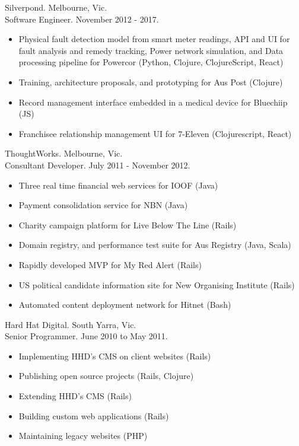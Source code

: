 \documentclass[margin]{res}
\begin{document}
\begin{resume}
  Silverpond. Melbourne, Vic. \\
  Software Engineer.  November 2012 - 2017.
  \begin{itemize}
  \item Physical fault detection model from smart meter readings, API and UI for
    fault analysis and remedy tracking, Power network simulation, and Data
    processing pipeline for Powercor (Python, Clojure, ClojureScript, React)
  \item Training, architecture proposals, and prototyping for Aus Post (Clojure)
  \item Record management interface embedded in a medical device for Bluechiip
    (JS)
  \item Franchisee relationship management UI for 7-Eleven (Clojurescript,
    React)
  \end{itemize} 

  ThoughtWorks. Melbourne, Vic. \\
  Consultant Developer.  July 2011 - November 2012.
  \begin{itemize}
  \item Three real time financial web services for IOOF (Java)
  \item Payment consolidation service for NBN (Java)
  \item Charity campaign platform for Live Below The Line (Rails)
  \item Domain registry, and performance test suite for Aus Registry (Java,
    Scala)
  \item Rapidly developed MVP for My Red Alert (Rails)
  \item US political candidate information site for New Organising Institute
    (Rails)
  \item Automated content deployment network for Hitnet (Bash)
  \end{itemize} 

  Hard Hat Digital. South Yarra, Vic. \\
  Senior Programmer.  June 2010 to May 2011.
  \begin{itemize}
  \item Implementing HHD's CMS on client websites (Rails)
  \item Publishing open source projects (Rails, Clojure)
  \item Extending HHD's CMS (Rails)
  \item Building custom web applications (Rails)
  \item Maintaining legacy websites (PHP)
  \end{itemize} 


\end{resume}
\end{document}
